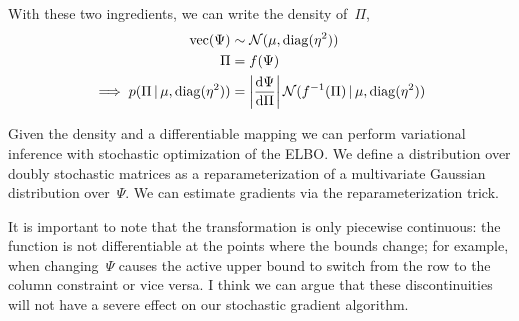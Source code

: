 \documentclass[twoside]{article}
\begin{document}
With these two ingredients, we can write the density of~${\Pi}$,
\begin{align}
  \text{vec} (\Psi) &\sim \mathcal{N}(\mu, \operatorname{diag}(\eta^2))
  \\
  {\Pi} &= f(\Psi) \\
  \implies
  p(\Pi \, | \, \mu, \operatorname{diag}(\eta^2)) &= \left|\frac{\mathrm{d} \Psi }{\mathrm{d} {\Pi}} \right|
  \mathcal{N}(f^{-1}({\Pi}) \, | \, \mu, \operatorname{diag}(\eta^2))
\end{align}

Given the density and a differentiable mapping we can perform
variational inference with stochastic optimization of the ELBO.
We define a distribution over doubly stochastic matrices as a
reparameterization of a multivariate Gaussian distribution
over~$\Psi$. We can estimate gradients via the reparameterization
trick.

It is important to note that the transformation is only piecewise
continuous: the function is not differentiable at the points where
the bounds change; for example, when changing~$\Psi$ causes the
active upper bound to switch from the row to the column constraint
or vice versa.  I think we can argue that these discontinuities
will not have a severe effect on our stochastic gradient algorithm.
\end{document}
